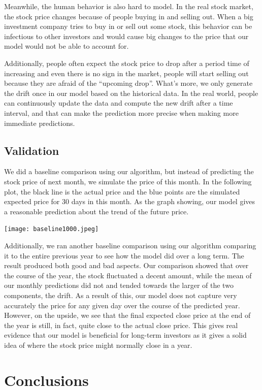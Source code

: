 \documentclass{article}
\begin{document}
Meanwhile, the human behavior is also hard to model. In the real stock market, the stock price changes because of people buying in and selling out. When a big investment company tries to buy in or sell out some stock, this behavior can be infectious to other investors and would cause big changes to the price that our model would not be able to account for.

Additionally, people often expect the stock price to drop after a period time of increasing and even there is no sign in the market, people will start selling out because they are afraid of the ``upcoming drop”. What's more, we only generate the drift once in our model based on the historical data. In the real world, people can continuously update the data and compute the new drift after a time interval, and that can make the prediction more precise when making more immediate predictions.


\subsection{Validation}
We did a baseline comparison using our algorithm, but instead of predicting the stock price of next month, we simulate the price of this month. In the following plot, the black line is the actual price and the blue points are the simulated expected price for 30 days in this month. As the graph showing, our model gives a reasonable prediction about the trend of the future price. 

\texttt{[image: baseline1000.jpeg]}

Additionally, we ran another baseline comparison using our algorithm comparing it to the entire previous year to see how the model did over a long term. The result produced both good and bad aspects. Our comparison showed that over the course of the year, the stock fluctuated a decent amount, while the mean of our monthly predictions did not and tended towards the larger of the two components, the drift. As a result of this, our model does not capture very accurately the price for any given day over the course of the predicted year. However, on the upside, we see that the final expected close price at the end of the year is still, in fact, quite close to the actual close price. This gives real evidence that our model is beneficial for long-term investors as it gives a solid idea of where the stock price might normally close in a year.

\section{Conclusions}
\end{document}
